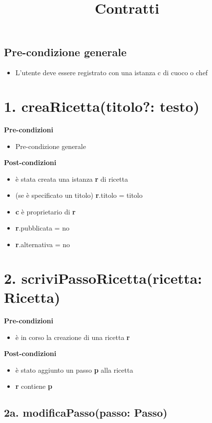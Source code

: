 \documentclass[12pt]{extarticle}
\begin{document}
\title{Contratti}
\date{}
\maketitle

\subsection*{Pre-condizione generale}
\begin{itemize}
  \item L'utente deve essere registrato con una istanza c di cuoco o chef
\end{itemize}

\section*{1. creaRicetta(titolo?: testo)}
\textbf{Pre-condizioni}
\begin{itemize}
  \item Pre-condizione generale
\end{itemize}
\textbf{Post-condizioni}
\begin{itemize}
  \item è stata creata una istanza \textbf{r} di ricetta
  \item (se è specificato un titolo) \textbf{r}.titolo = titolo
  \item \textbf{c} è proprietario di \textbf{r}
  \item \textbf{r}.pubblicata = no
  \item \textbf{r}.alternativa = no
\end{itemize}

\section*{2. scriviPassoRicetta(ricetta: Ricetta)}

\textbf{Pre-condizioni} 	
\begin{itemize}
  \item è in corso la creazione di una ricetta  \textbf{r}
\end{itemize}
\textbf{Post-condizioni}
\begin{itemize}
  \item è stato aggiunto un passo  \textbf{p} alla ricetta
  \item  \textbf{r} contiene  \textbf{p}
\end{itemize}

\subsection*{2a. modificaPasso(passo: Passo)}
\end{document}

